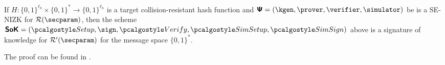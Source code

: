 \begin{theorem} 
  \label{thm:SoK}
If $H:\{0, 1\}^{\ell_k} \times \{0, 1\}^* \to \{0, 1\}^{\ell_h}$ is a target collision-resistant hash function 
and $\ps = (\kgen, \prover, \verifier, \simulator)$ be is a SE-NIZK for $\RELGEN(\secparam)$, then the scheme
 $\SoK = (\signsetup,  \sign, \allowbreak \verify,  \simsetup, \simsign)$ above is a signature of knowledge for $\RELGEN'(\secparam)$ for  the message space $\{0, 1\}^*$.
\end{theorem}
 The proof can be found in 
 \cite{C:GroMal17}.
	

